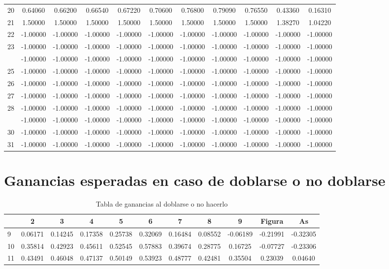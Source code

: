 \documentclass[12pt,a4paper,]{book}
\numberwithin{dummy}{section}
\theoremstyle{ocrenumbox}
\theoremstyle{blacknumex}
\theoremstyle{blacknumbox}
\theoremstyle{ocrenum}
\theoremstyle{ocrenum}
\begin{document}
\begin{longtable}[t]{lcccccccccc}
20 & 0.64060 & 0.66200 & 0.66540 & 0.67220 & 0.70600 & 0.76800 & 0.79090 & 0.76550 & 0.43360 & 0.16310\\
21 & 1.50000 & 1.50000 & 1.50000 & 1.50000 & 1.50000 & 1.50000 & 1.50000 & 1.50000 & 1.38270 & 1.04220\\
22 & -1.00000 & -1.00000 & -1.00000 & -1.00000 & -1.00000 & -1.00000 & -1.00000 & -1.00000 & -1.00000 & -1.00000\\
23 & -1.00000 & -1.00000 & -1.00000 & -1.00000 & -1.00000 & -1.00000 & -1.00000 & -1.00000 & -1.00000 & -1.00000\\
\addlinespace
24 & -1.00000 & -1.00000 & -1.00000 & -1.00000 & -1.00000 & -1.00000 & -1.00000 & -1.00000 & -1.00000 & -1.00000\\
25 & -1.00000 & -1.00000 & -1.00000 & -1.00000 & -1.00000 & -1.00000 & -1.00000 & -1.00000 & -1.00000 & -1.00000\\
26 & -1.00000 & -1.00000 & -1.00000 & -1.00000 & -1.00000 & -1.00000 & -1.00000 & -1.00000 & -1.00000 & -1.00000\\
27 & -1.00000 & -1.00000 & -1.00000 & -1.00000 & -1.00000 & -1.00000 & -1.00000 & -1.00000 & -1.00000 & -1.00000\\
28 & -1.00000 & -1.00000 & -1.00000 & -1.00000 & -1.00000 & -1.00000 & -1.00000 & -1.00000 & -1.00000 & -1.00000\\
\addlinespace
29 & -1.00000 & -1.00000 & -1.00000 & -1.00000 & -1.00000 & -1.00000 & -1.00000 & -1.00000 & -1.00000 & -1.00000\\
30 & -1.00000 & -1.00000 & -1.00000 & -1.00000 & -1.00000 & -1.00000 & -1.00000 & -1.00000 & -1.00000 & -1.00000\\
31 & -1.00000 & -1.00000 & -1.00000 & -1.00000 & -1.00000 & -1.00000 & -1.00000 & -1.00000 & -1.00000 & -1.00000\\
\bottomrule
\end{longtable}
\endgroup{}

\hypertarget{ganancias-esperadas-en-caso-de-doblarse-o-no-doblarse}{%
\section{Ganancias esperadas en caso de doblarse o no
doblarse}\label{ganancias-esperadas-en-caso-de-doblarse-o-no-doblarse}}

\begingroup\fontsize{12}{14}\selectfont

\begin{longtable}[t]{lcccccccccc}
\caption{\label{tab:unnamed-chunk-76}Tabla de ganancias al doblarse o no hacerlo}\\
\toprule
 & 2 & 3 & 4 & 5 & 6 & 7 & 8 & 9 & Figura & As\\
\midrule
9 & 0.06171 & 0.14245 & 0.17358 & 0.25738 & 0.32069 & 0.16484 & 0.08552 & -0.06189 & -0.21991 & -0.32305\\
10 & 0.35814 & 0.42923 & 0.45611 & 0.52545 & 0.57883 & 0.39674 & 0.28775 & 0.16725 & -0.07727 & -0.23306\\
11 & 0.43491 & 0.46048 & 0.47137 & 0.50149 & 0.53923 & 0.48777 & 0.42481 & 0.35504 & 0.23039 & 0.04640\\
\bottomrule
\end{longtable}
\endgroup{}
\end{document}
